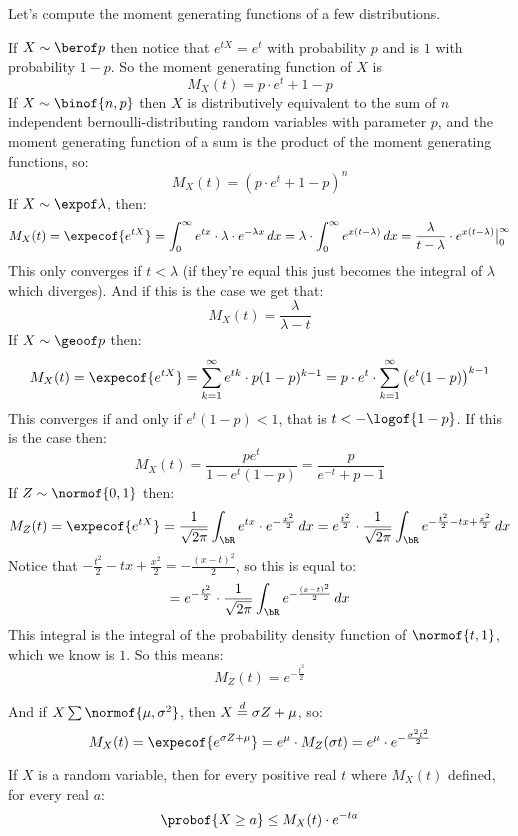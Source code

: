 Let's compute the moment generating functions of a few distributions.
\begin{msecitemize}
	\mitem If $X\sim\berof p$ then notice that $e^{tX}=e^t$ with probability $p$ and is $1$ with probability $1-p$.
	So the moment generating function of $X$ is
		\[ M_X(t) = p\cdot e^t + 1 - p \]
	\mitem If $X\sim\binof{n,p}$ then $X$ is distributively equivalent to the sum of $n$ independent bernoulli-distributing
		random variables with parameter $p$, and the moment generating function of a sum is the product of the moment generating
		functions, so:
		\[ M_X(t) = (p\cdot e^t + 1 - p)^n \]
	\mitem If $X\sim\expof\lambda$, then:
		\[ M_X(t) = \expecof{e^{tX}} = \int_0^\infty e^{tx}\cdot\lambda\cdot e^{-\lambda x}\,dx =
		\lambda\cdot\int_0^\infty e^{x(t-\lambda)}\,dx = \frac{\lambda}{t-\lambda}\cdot e^{x(t-\lambda)}\big|_0^\infty \]
		This only converges if $t<\lambda$ (if they're equal this just becomes the integral of $\lambda$ which diverges).
		And if this is the case we get that:
		\[ M_X(t) = \frac\lambda{\lambda - t} \]
	\mitem If $X\sim\geoof p$ then:
		\[ M_X(t) = \expecof{e^{tX}} = \sum_{k=1}^\infty e^{tk}\cdot p(1-p)^{k-1} =
		p\cdot e^t\cdot\sum_{k=1}^\infty \big(e^t(1-p)\big)^{k-1} \]
		This converges if and only if $e^t(1-p)<1$, that is $t<-\logof{1-p}$.
		If this is the case then:
		\[ M_X(t) = \frac{pe^t}{1-e^t(1-p)} = \frac{p}{e^{-t}+p-1} \]
	\mitem If $Z\sim\normof{0,1}$ then:
		\[ M_Z(t) = \expecof{e^{tX}} = \frac1{\sqrt{2\pi}}\int_\bR e^{tx}\cdot e^{-\frac{x^2}2}\,dx =
		e^{\frac{t^2}2}\cdot\frac1{\sqrt{2\pi}}\int_\bR e^{-\frac{t^2}2-tx+\frac{x^2}2}\,dx \]
		Notice that $-\frac{t^2}2-tx+\frac{x^2}2=-\frac{(x-t)^2}2$, so this is equal to:
		\[ = e^{-\frac{t^2}2}\cdot\frac1{\sqrt{2\pi}}\int_\bR e^{-\frac{(x-t)^2}2}\,dx \]
		This integral is the integral of the probability density function of $\normof{t,1}$, which we know is $1$.
		So this means:
		\[ M_Z(t) = e^{-\frac{t^2}2} \]

		And if $X\sum\normof{\mu,\sigma^2}$, then $X\mathrel{\overset d=}\sigma Z+\mu$, so:
		\[ M_X(t) = \expecof{e^{\sigma Z+\mu}} = e^\mu\cdot M_Z(\sigma t) = e^\mu\cdot e^{-\frac{\sigma^2 t^2}2} \]
\end{msecitemize}

\begin{thrm*}

	If $X$ is a random variable, then for every positive real $t$ where $M_X(t)$ defined, for every real $a$:
	\[ \probof{X\geq a}\leq M_X(t)\cdot e^{-ta} \]

\end{thrm*}

